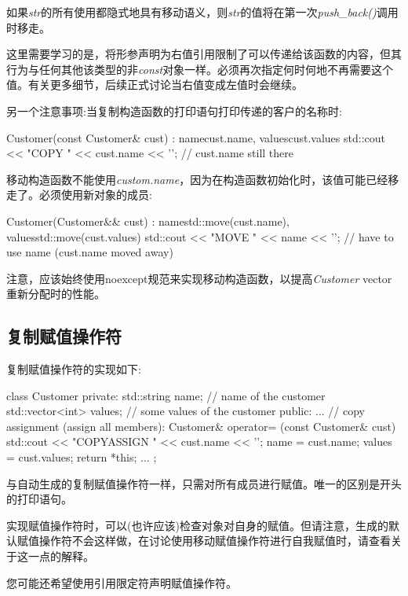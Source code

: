 如果\textit{str}的所有使用都隐式地具有移动语义，则\textit{str}的值将在第一次\textit{push_back()}调用时移走。

这里需要学习的是，将形参声明为右值引用限制了可以传递给该函数的内容，但其行为与任何其他该类型的非\textit{const}对象一样。必须再次指定何时何地不再需要这个值。有关更多细节，后续正式讨论当右值变成左值时会继续。

另一个注意事项:当复制构造函数的打印语句打印传递的客户的名称时:

\begin{cppcode}
Customer(const Customer& cust)
: name{cust.name}, values{cust.values} {
	std::cout << "COPY " << cust.name << '\n'; // cust.name still there
}
\end{cppcode}

移动构造函数不能使用\textit{custom.name}，因为在构造函数初始化时，该值可能已经移走了。必须使用新对象的成员:

\begin{cppcode}
Customer(Customer&& cust)
: name{std::move(cust.name)}, values{std::move(cust.values)} {
	std::cout << "MOVE " << name << '\n'; // have to use name (cust.name moved away)
}
\end{cppcode}

注意，应该始终使用noexcept规范来实现移动构造函数，以提高\textit{Customer} vector重新分配时的性能。

\subsection{复制赋值操作符}

复制赋值操作符的实现如下:

\begin{cppcode}
class Customer {
	private:
	std::string name; // name of the customer
	std::vector<int> values; // some values of the customer
	public:
	...
	// copy assignment (assign all members):
	Customer& operator= (const Customer& cust) {
		std::cout << "COPYASSIGN " << cust.name << '\n';
		name = cust.name;
		values = cust.values;
		return *this;
	}
...
};
\end{cppcode}

与自动生成的复制赋值操作符一样，只需对所有成员进行赋值。唯一的区别是开头的打印语句。

实现赋值操作符时，可以(也许应该)检查对象对自身的赋值。但请注意，生成的默认赋值操作符不会这样做，在讨论使用移动赋值操作符进行自我赋值时，请查看关于这一点的解释。

您可能还希望使用引用限定符声明赋值操作符。

